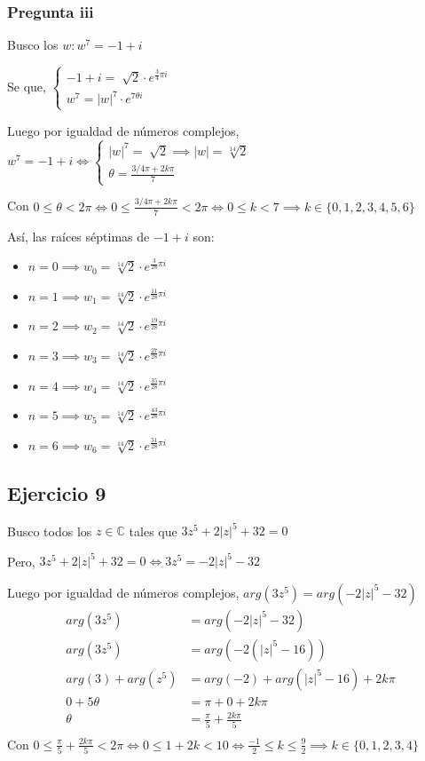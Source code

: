 \subsubsection{Pregunta iii}

Busco los $ w: w^7 = -1+i $

Se que, $ \begin{cases}
    -1+i = \sqrt[]{2} \cdot e^{\frac{3}{4}\pi i} \\
    w^7 = |w|^7 \cdot e^{7 \theta i}
\end{cases} $

Luego por igualdad de números complejos, $ w^7 = -1+i \iff \begin{cases}
    |w|^7 = \sqrt[]{2} \implies |w| = \sqrt[14]{2} \\
    \theta = \frac{3/4\pi+2k\pi}{7}
\end{cases} $

Con $ 0 \leq \theta < 2\pi \iff 0 \leq \frac{3/4\pi+2k\pi}{7} < 2\pi \iff 0 \leq k < 7 \implies k \in \{ 0,1,2,3,4,5,6 \} $

Así, las raíces séptimas de $ -1+i $ son:
\begin{itemize}
    \item $ n = 0 \implies w_0 = \sqrt[14]{2} \cdot e^{\frac{3}{28} \pi i} $
    \item $ n = 1 \implies w_1 = \sqrt[14]{2} \cdot e^{\frac{11}{28} \pi i} $
    \item $ n = 2 \implies w_2 = \sqrt[14]{2} \cdot e^{\frac{19}{28} \pi i} $
    \item $ n = 3 \implies w_3 = \sqrt[14]{2} \cdot e^{\frac{27}{28} \pi i} $
    \item $ n = 4 \implies w_4 = \sqrt[14]{2} \cdot e^{\frac{35}{28} \pi i} $
    \item $ n = 5 \implies w_5 = \sqrt[14]{2} \cdot e^{\frac{43}{28} \pi i} $
    \item $ n = 6 \implies w_6 = \sqrt[14]{2} \cdot e^{\frac{51}{28} \pi i} $
\end{itemize}

\subsection{Ejercicio 9}

Busco todos los $ z \in \mathbb{C} $ tales que $ 3z^5 + 2|z|^5 + 32 = 0 $

Pero, $ 3z^5 + 2|z|^5 + 32 = 0 \iff 3z^5 = -2|z|^5 - 32 $

Luego por igualdad de números complejos, $ arg(3z^5) = arg(-2|z|^5-32) $
\begin{align*}
    arg(3z^5) &= arg(-2|z|^5-32) \\
    arg(3z^5) &= arg(-2(|z|^5-16)) \\
    arg(3) + arg(z^5) &= arg(-2) + arg(|z|^5-16) + 2k\pi \\
    0 + 5\theta &= \pi + 0 + 2k\pi \\
    \theta &= \frac{\pi}{5} + \frac{2k\pi}{5} \\
\end{align*}
Con $ 0 \leq \frac{\pi}{5} + \frac{2k\pi}{5} < 2\pi \iff 0 \leq 1+2k <10 \iff \frac{-1}{2} \leq k \leq \frac{9}{2} \implies k \in \{0,1,2,3,4\}$

